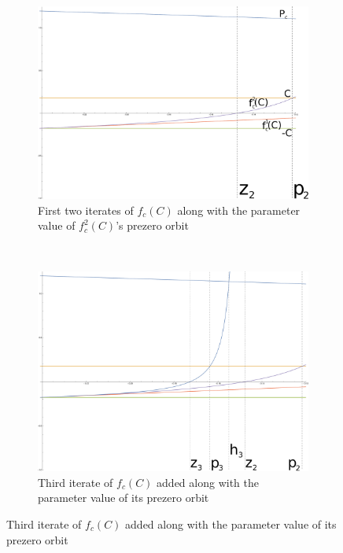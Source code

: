 \begin{figure}[ht]
		\centering
		\begin{subfigure}[b]{0.5\textwidth}
				\includegraphics[width=\textwidth]{./img/cplot1S}
				\caption{First two iterates of $f_c (C)$ along with the parameter value of $f^2_c (C)$'s prezero orbit}
				\label{fig:cplot1S}
		\end{subfigure}%
		~ %
		\begin{subfigure}[b]{0.5\textwidth}
				\includegraphics[width=\textwidth]{./img/cplot2S}
				\caption{Third iterate of $f_c (C)$ added along with the parameter value of its prezero orbit}
				\label{fig:cplot2S}

\end{subfigure}
\end{figure}
